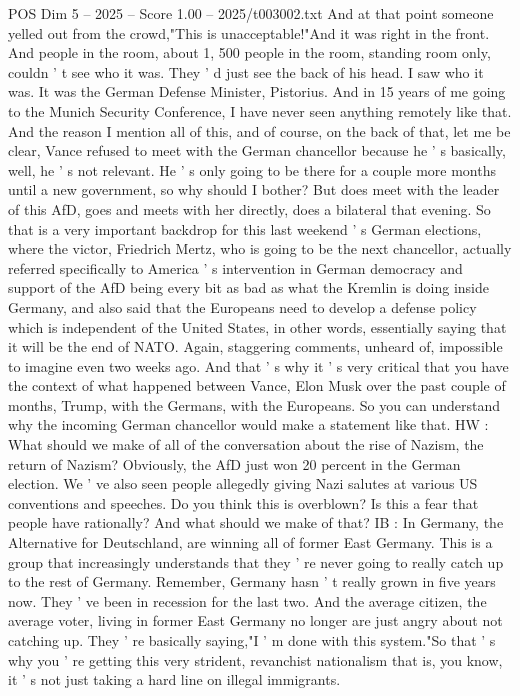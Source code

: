 \begin{textsample}{POS Dim 5 – 2025 – Score 1.00 – 2025/t003002.txt}
And at that point someone yelled out from the crowd,"This is unacceptable!"And it was right in the front.
And people in the room, about 1, 500 people in the room, standing room only, couldn ' t see who it was.
They ' d just see the back of his head.
I saw who it was.
It was the German Defense Minister, Pistorius.
And in 15 years of me going to the Munich Security Conference, I have never seen anything remotely like that.
And the reason I mention all of this, and of course, on the back of that, let me be clear, Vance refused to meet with the German chancellor because he ' s basically, well, he ' s not relevant.
He ' s only going to be there for a couple more months until a new government, so why should I bother?
But does meet with the leader of this AfD, goes and meets with her directly, does a bilateral that evening.
So that is a very important backdrop for this last weekend ' s German elections, where the victor, Friedrich Mertz, who is going to be the next chancellor, actually referred specifically to America ' s intervention in German democracy and support of the AfD being every bit as bad as what the Kremlin is doing inside Germany, and also said that the Europeans need to develop a defense policy which is independent of the United States, in other words, essentially saying that it will be the end of NATO.
Again, staggering comments, unheard of, impossible to imagine even two weeks ago.
And that ' s why it ' s very critical that you have the context of what happened between Vance, Elon Musk over the past couple of months, Trump, with the Germans, with the Europeans.
So you can understand why the incoming German chancellor would make a statement like that.
HW : What should we make of all of the conversation about the rise of Nazism, the return of Nazism?
Obviously, the AfD just won 20 percent in the German election.
We ' ve also seen people allegedly giving Nazi salutes at various US conventions and speeches.
Do you think this is overblown?
Is this a fear that people have rationally?
And what should we make of that?
IB : In Germany, the Alternative for Deutschland, are winning all of former East Germany.
This is a group that increasingly understands that they ' re never going to really catch up to the rest of Germany.
Remember, Germany hasn ' t really grown in five years now.
They ' ve been in recession for the last two.
And the average citizen, the average voter, living in former East Germany no longer are just angry about not catching up.
They ' re basically saying,"I ' m done with this system."So that ' s why you ' re getting this very strident, revanchist nationalism that is, you know, it ' s not just taking a hard line on illegal immigrants.

\end{textsample}
